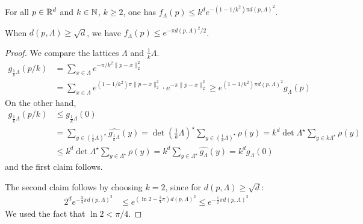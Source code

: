 \begin{lemma}
  \label{lemma:f-small-close-to-lattice}
  For all $p \in \mathbb{R}^d$ and $k \in \mathbb{N}$, $k \geq 2$,
  one has $f_\Lambda(p) \leq k^d e^{-(1-1/k^2) \pi d(p,\Lambda)^2}$.

  When $d(p,\Lambda) \geq \sqrt{d}$, we have $f_\Lambda(p) \leq e^{-\pi d(p,\Lambda)^2 / 2}$.
\end{lemma}
\begin{proof}
  We compare the lattices $\Lambda$ and $\frac{1}{k} \Lambda$.
  \begin{align*}
    g_{\frac{1}{k}\Lambda}(p/k) &= \sum_{x\in\Lambda} e^{-\pi/k^2 \|p - x\|_2^2} \\
      &= \sum_{x \in\Lambda} e^{(1-1/k^2) \pi \|p - x\|_2^2} \cdot e^{-\pi \|p - x\|_2^2}
      \geq e^{(1-1/k^2) \pi d(p,\Lambda)^2} g_\Lambda(p)
  \end{align*}
  On the other hand,
  \begin{align*}
    g_{\frac{1}{k}\Lambda}(p/k)
      &\leq g_{\frac{1}{k}\Lambda}(0) \\
      &= \sum_{y \in (\frac{1}{k}\Lambda)^\star} \widehat{g_{\frac{1}{k}\Lambda}}(y)
      = \det (\frac{1}{k}\Lambda)^\star \sum_{y \in (\frac{1}{k}\Lambda)^\star} \rho(y)
      = k^d \det\Lambda^\star \sum_{y \in k\Lambda^\star} \rho(y) \\
      &\leq k^d \det\Lambda^\star \sum_{y \in \Lambda^\star} \rho(y)
      = k^d \sum_{y\in\Lambda^\star} \widehat{g_\Lambda}(y) = k^d g_\Lambda(0)
  \end{align*}
  and the first claim follows.

  The second claim follows by choosing $k = 2$,
  since for $d(p,\Lambda) \geq \sqrt{d}$:
  \begin{align*}
    2^d e^{-\frac{3}{4} \pi d(p,\Lambda)^2}
      &\leq e^{(\ln 2 - \frac{3}{4}\pi) d(p,\Lambda)^2} \leq e^{-\frac{1}{2} \pi d(p, \Lambda)^2}
  \end{align*}
  We used the fact that $\ln 2 < \pi/4$.
\end{proof}

